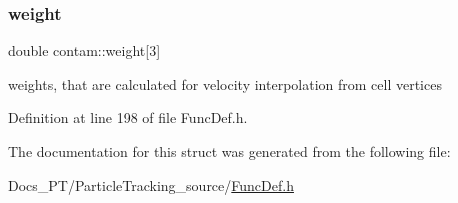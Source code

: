 \subsubsection{\texorpdfstring{weight}{weight}}
{\footnotesize\ttfamily double contam\+::weight\mbox{[}3\mbox{]}}

weights, that are calculated for velocity interpolation from cell vertices 

Definition at line 198 of file Func\+Def.\+h.



The documentation for this struct was generated from the following file\+:\begin{DoxyCompactItemize}
\item 
Docs\+\_\+\+P\+T/\+Particle\+Tracking\+\_\+source/\mbox{\hyperlink{_func_def_8h}{Func\+Def.\+h}}\end{DoxyCompactItemize}

